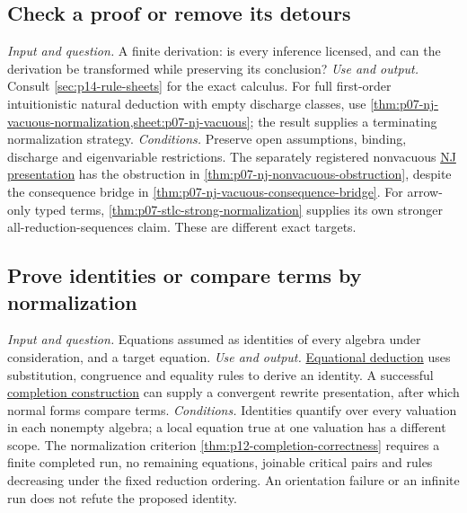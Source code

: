 \subsection{Check a proof or remove its detours}
\label{sec:p14-finder-proof-transformation}
\textit{Input and question.} A finite derivation: is every inference licensed,
and can the derivation be transformed while preserving its conclusion?
\textit{Use and output.} Consult \cref{sec:p14-rule-sheets} for the exact
calculus. For full first-order intuitionistic natural deduction with empty
discharge classes, use
\cref{thm:p07-nj-vacuous-normalization,sheet:p07-nj-vacuous}; the result
supplies a terminating normalization strategy.
\textit{Conditions.} Preserve open assumptions, binding, discharge and
eigenvariable restrictions. The separately registered nonvacuous
\hyperref[sheet:nj]{NJ presentation} has the obstruction in
\cref{thm:p07-nj-nonvacuous-obstruction}, despite the consequence bridge in
\cref{thm:p07-nj-vacuous-consequence-bridge}. For arrow-only typed terms,
\cref{thm:p07-stlc-strong-normalization} supplies its own stronger
all-reduction-sequences claim. These are different exact targets.

\subsection{Prove identities or compare terms by normalization}
\label{sec:p14-finder-equations}
\textit{Input and question.} Equations assumed as identities of every algebra
under consideration, and a target equation.
\textit{Use and output.}
\hyperref[sec:p10-equational-logic]{Equational deduction} uses substitution,
congruence and equality rules to derive an identity. A successful
\hyperref[def:p12-completion]{completion construction} can supply a convergent
rewrite presentation, after which normal forms compare terms.
\textit{Conditions.} Identities quantify over every valuation in each
nonempty algebra; a local equation true at one valuation has a different
scope. The normalization criterion
\cref{thm:p12-completion-correctness} requires a finite completed run,
no remaining equations, joinable critical pairs and rules decreasing under
the fixed reduction ordering. An orientation failure or an infinite run does
not refute the proposed identity.

